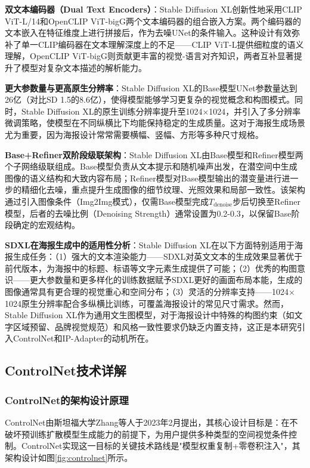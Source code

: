 \documentclass[12pt,a4paper]{ctexart}
\newcommand{\sdxl}{Stable Diffusion XL}
\newcommand{\controlnet}{ControlNet}
\newcommand{\ipadapter}{IP-Adapter}
\begin{document}
\textbf{双文本编码器（Dual Text Encoders）}：\sdxl{}创新性地采用CLIP ViT-L/14和OpenCLIP ViT-bigG两个文本编码器的组合嵌入方案。两个编码器的文本嵌入在特征维度上进行拼接后，作为去噪UNet的条件输入。这种设计有效弥补了单一CLIP编码器在文本理解深度上的不足——CLIP ViT-L提供细粒度的语义理解，OpenCLIP ViT-bigG则贡献更丰富的视觉-语言对齐知识，两者互补显著提升了模型对复杂文本描述的解析能力。

\textbf{更大参数量与更高原生分辨率}：\sdxl{}的Base模型UNet参数量达到26亿（对比SD 1.5的8.6亿），使得模型能够学习更复杂的视觉概念和构图模式。同时，\sdxl{}的原生训练分辨率提升至1024$\times$1024，并引入了多分辨率微调策略，使模型在不同纵横比下均能保持稳定的生成质量。这对于海报生成场景尤为重要，因为海报设计常常需要横幅、竖幅、方形等多种尺寸规格。

\textbf{Base+Refiner双阶段级联架构}：\sdxl{}由Base模型和Refiner模型两个子网络级联组成。Base模型负责从文本提示和随机噪声出发，在潜空间中生成图像的语义结构和大致内容布局；Refiner模型对Base模型输出的潜变量进行进一步的精细化去噪，重点提升生成图像的细节纹理、光照效果和局部一致性。该架构通过引入图像条件（Img2Img模式），仅需Base模型完成$T_{\text{denoise}}$步后切换至Refiner模型，后者的去噪比例（Denoising Strength）通常设置为0.2-0.3，以保留Base阶段确定的宏观结构。

\textbf{SDXL在海报生成中的适用性分析}：\sdxl{}在以下方面特别适用于海报生成任务：（1）强大的文本渲染能力——SDXL对英文文本的生成效果显著优于前代版本，为海报中的标题、标语等文字元素生成提供了可能；（2）优秀的构图意识——更大参数量和更多样化的训练数据赋予SDXL更好的画面布局本能，生成的图像通常具有更合理的视觉重心和空间分布；（3）灵活的分辨率支持——1024$\times$1024原生分辨率配合多纵横比训练，可覆盖海报设计的常见尺寸需求。然而，\sdxl{}作为通用文生图模型，对于海报设计中特殊的构图约束（如文字区域预留、品牌视觉规范）和风格一致性要求仍缺乏内置支持，这正是本研究引入\controlnet{}和\ipadapter{}的动机所在。

\subsection{ControlNet技术详解}

\subsubsection{ControlNet的架构设计原理}

\controlnet{}由斯坦福大学Zhang等人于2023年2月提出，其核心设计目标是：在不破坏预训练扩散模型生成能力的前提下，为用户提供多种类型的空间视觉条件控制。\controlnet{}实现这一目标的关键技术路线是"模型权重复制+零卷积注入"，其架构设计如图\ref{fig:controlnet}所示。
\end{document}
